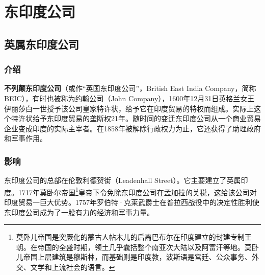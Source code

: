 \documentclass{ctexbook}
\begin{document}
 
\tableofcontents  
\part{东印度公司}
\chapter{英属东印度公司}
\section{介绍} 
\begin{figwindow}
    \textbf{不列颠东印度公司}（或作“英国东印度公司”，British East India Company，简称BEIC），有时也被称为约翰公司（John Company），1600年12月31日英格兰女王伊丽莎白一世授予该公司皇家特许状，给予它在印度贸易的特权而组成。实际上这个特许状给予东印度贸易的垄断权21年。随时间的变迁东印度公司从一个商业贸易企业变成印度的实际主宰者。在1858年被解除行政权力为止，它还获得了助理政府和军事作用。
\end{figwindow}
\section{影响}
东印度公司的总部在伦敦利德贺街（Leadenhall Street）。它主要建立了英属印度。1717年莫卧尔帝国\footnote{莫卧儿帝国是突厥化的蒙古人帖木儿的后裔巴布尔在印度建立的封建专制王朝。在帝国的全盛时期，领土几乎囊括整个南亚次大陆以及阿富汗等地。莫卧儿帝国上层建筑是穆斯林，而基础则是印度教，波斯语是宫廷、公众事务、外交、文学和上流社会的语言。}皇帝下令免除东印度公司在孟加拉的关税，这给该公司对印度贸易一巨大优势。1757年罗伯特·克莱武爵士在普拉西战役中的决定性胜利使东印度公司成为了一股有力的经济和军事力量。
\end{document}
